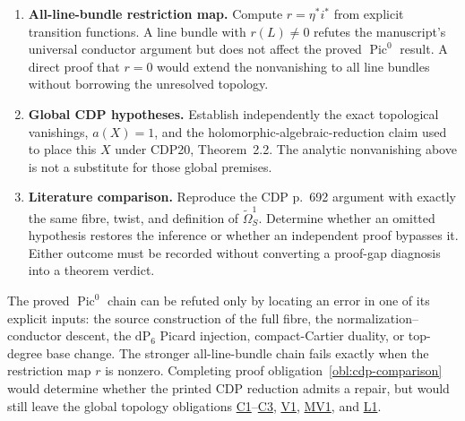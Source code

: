 \begin{enumerate}[label=\arabic*.]
\item \textbf{All-line-bundle restriction map.} Compute
$r=\eta^*i^*$ from explicit transition functions.  A line bundle with
$r(L)\ne0$ refutes the manuscript's universal conductor argument but does
not affect the proved $\operatorname{Pic}^0$ result.  A direct proof that
$r=0$ would extend the nonvanishing to all line bundles without borrowing
the unresolved topology.

\item \textbf{Global CDP hypotheses.} Establish independently the exact
topological vanishings, $a(X)=1$, and the holomorphic-algebraic-reduction
claim used to place this $X$ under CDP20, Theorem~2.2.  The analytic
nonvanishing above is not a substitute for those global premises.

\item \textbf{Literature comparison.} Reproduce the CDP p.~692 argument
with exactly the same fibre, twist, and definition of
$\widetilde\Omega^1_S$. Determine whether an omitted hypothesis restores
the inference or whether an independent proof bypasses it. Either outcome
must be recorded without converting a proof-gap diagnosis into a theorem
verdict.
\end{enumerate}


\begin{test}
The proved $\operatorname{Pic}^0$ chain can be refuted only by locating an
error in one of its explicit inputs: the source construction of the full
fibre, the normalization--conductor descent, the $\mathrm{dP}_6$ Picard
injection, compact-Cartier duality, or top-degree base change.  The stronger
all-line-bundle chain fails exactly when the restriction map $r$ is nonzero.
Completing proof obligation~\ref{obl:cdp-comparison} would determine whether
the printed CDP reduction admits a repair, but would still leave the global
topology obligations
\hyperref[obl:C1]{C1}--\hyperref[obl:C3]{C3},
\hyperref[obl:V1]{V1}, \hyperref[obl:MV1]{MV1}, and
\hyperref[obl:L1]{L1}.
\end{test}
